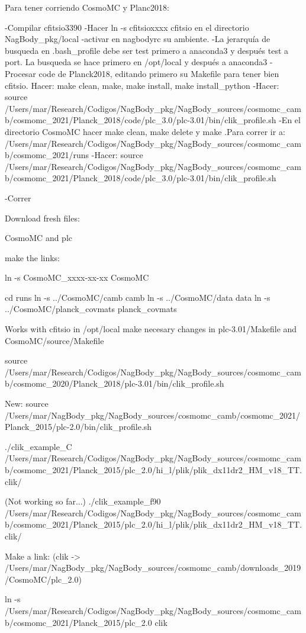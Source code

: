 Para tener corriendo CosmoMC y Planc2018:

-Compilar cfitsio3390
-Hacer ln -s cfitsioxxxx cfitsio en el directorio NagBody_pkg/local
-activar en nagbodyrc su ambiente.
-La jerarquía de busqueda en .bash_profile debe ser test primero a anaconda3 y después test a port. La busqueda se hace primero en /opt/local y después a anaconda3
-Procesar code de Planck2018, editando primero su Makefile para tener bien cfitsio. Hacer: make clean, make, make install, make install_python
-Hacer:
source /Users/mar/Research/Codigos/NagBody_pkg/NagBody_sources/cosmomc_camb/cosmomc_2021/Planck_2018/code/plc_3.0/plc-3.01/bin/clik_profile.sh
-En el directorio CosmoMC hacer make clean, make delete y make
.Para correr ir a: /Users/mar/Research/Codigos/NagBody_pkg/NagBody_sources/cosmomc_camb/cosmomc_2021/runs
-Hacer:
source /Users/mar/Research/Codigos/NagBody_pkg/NagBody_sources/cosmomc_camb/cosmomc_2021/Planck_2018/code/plc_3.0/plc-3.01/bin/clik_profile.sh

-Correr


Download fresh files:

CosmoMC and plc

make the links:

ln -s CosmoMC_xxxx-xx-xx CosmoMC

cd runs
ln -s ../CosmoMC/camb camb
ln -s ../CosmoMC/data data
ln -s ../CosmoMC/planck_covmats planck_covmats

Works with cfitsio in /opt/local make necesary changes in plc-3.01/Makefile and CosmoMC/source/Makefile

source /Users/mar/Research/Codigos/NagBody_pkg/NagBody_sources/cosmomc_camb/cosmomc_2020/Planck_2018/plc-3.01/bin/clik_profile.sh

New:
source /Users/mar/NagBody_pkg/NagBody_sources/cosmomc_camb/cosmomc_2021/Planck_2015/plc-2.0/bin/clik_profile.sh

./clik_example_C /Users/mar/Research/Codigos/NagBody_pkg/NagBody_sources/cosmomc_camb/cosmomc_2021/Planck_2015/plc_2.0/hi_l/plik/plik_dx11dr2_HM_v18_TT.clik/

(Not working so far...)
./clik_example_f90 /Users/mar/Research/Codigos/NagBody_pkg/NagBody_sources/cosmomc_camb/cosmomc_2021/Planck_2015/plc_2.0/hi_l/plik/plik_dx11dr2_HM_v18_TT.clik/

Make a link:
(clik -> /Users/mar/NagBody_pkg/NagBody_sources/cosmomc_camb/downloads_2019/CosmoMC/plc_2.0)

ln -s /Users/mar/Research/Codigos/NagBody_pkg/NagBody_sources/cosmomc_camb/cosmomc_2021/Planck_2015/plc_2.0 clik

